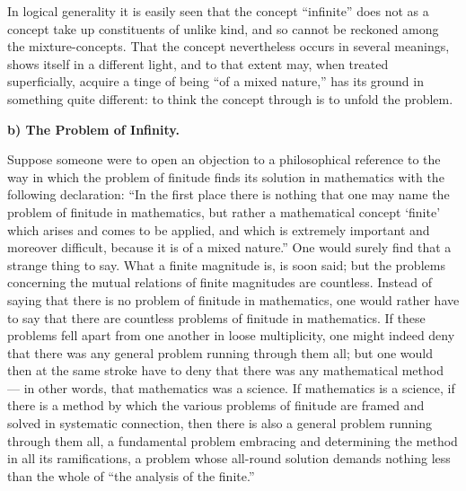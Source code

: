 \documentclass[12pt,a4paper]{book}
\begin{document}
In logical generality it is easily seen that the concept ``infinite'' does not
as a concept take up constituents of unlike kind, and so cannot be reckoned
among the mixture-concepts. That the concept nevertheless occurs in several
meanings, shows itself in a different light, and to that extent may, when
treated superficially, acquire a tinge of being ``of a mixed nature,'' has its
ground in something quite different: to think the concept through is to unfold
the problem.

\textbf{b) The Problem of Infinity.}
Suppose someone were to open an objection to a philosophical reference to the
way in which the problem of finitude finds its solution in mathematics with the
following declaration: ``In the first place there is nothing that one may name
the problem of finitude in mathematics, but rather a mathematical concept
`finite' which arises and comes to be applied, and which is extremely important
and moreover difficult, because it is of
a mixed nature.'' One would surely find that a strange thing to say. What a
finite magnitude is, is soon said; but the problems concerning the mutual
relations of finite magnitudes are countless. Instead of saying that there is
no problem of finitude in mathematics, one would rather have to say
that there are countless problems of finitude in mathematics. If these problems
fell apart from one another in loose multiplicity, one might indeed deny that
there was any general problem running through them all; but one would then at
the same stroke have to deny that there was any mathematical method --- in
other words, that mathematics was a science. If mathematics is a science, if
there is a method by which the various problems of finitude are framed and
solved in systematic connection, then there is also a general problem running
through them all, a fundamental problem embracing and determining the method in
all its ramifications, a problem whose all-round solution demands nothing less
than the whole of ``the analysis of the finite.''
\end{document}
